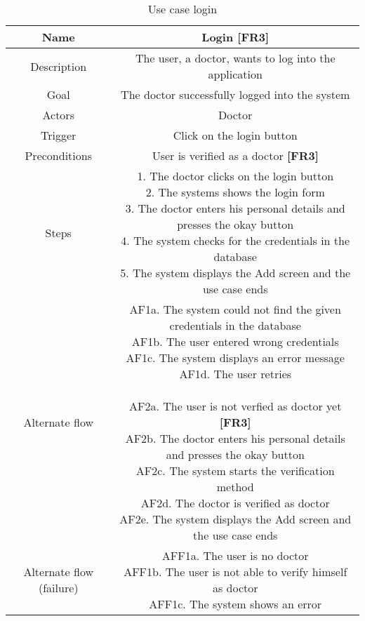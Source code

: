 \begin{table}[H]
	\begin{center}\scriptsize
		\begin{tabular}{ c|c } 
			\hline	
			Name & Login \textbf{[FR3]}\\ 
			\hline	
			Description & The user, a doctor, wants to log into the application \\ 
			\hline
			Goal & The doctor successfully logged into the system \\ 
			\hline
			Actors & Doctor \\ 
			\hline
			Trigger & Click on the login button \\ 
			\hline
			Preconditions & User is verified as a doctor \textbf{[FR3]} \\ 
			\hline
			Steps & \parbox{9cm}{\vspace{.5\baselineskip}
				1. The doctor clicks on the login button\\
				2. The systems shows the login form\\
				3. The doctor enters his personal details and presses the okay button\\
				4. The system checks for the credentials in the database\\
				5. The system displays the Add screen and the use case ends\\}\\
			\hline
			Alternate flow & \parbox{9cm}{\vspace{.5\baselineskip}
				AF1a. The system could not find the given credentials in the database\\
				AF1b. The user entered wrong credentials\\
				AF1c. The system displays an error message\\
				AF1d. The user retries\\\\
				AF2a. The user is not verfied as doctor yet \textbf{[FR3]}\\
				AF2b. The doctor enters his personal details and presses the okay button\\
				AF2c. The system starts the verification method\\
				AF2d. The doctor is verified as doctor\\
				AF2e. The system displays the Add screen and the use case ends\\}\\ 
			\hline
			Alternate flow (failure) & \parbox{9cm}{\vspace{.5\baselineskip}
				AFF1a. The user is no doctor\\
				AFF1b. The user is not able to verify himself as doctor\\
				AFF1c. The system shows an error}\\
			\hline
		\end{tabular}
	\end{center}\normalsize
	\caption{Use case login}
\end{table}
